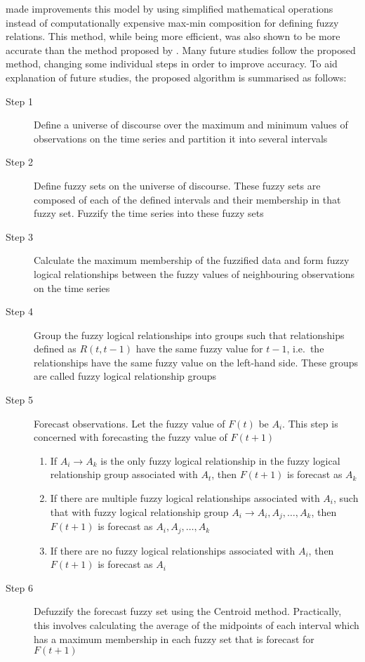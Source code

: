 \documentclass[12pt]{article}
\theoremstyle{definition}
\begin{document}
\cite{chen1996forecasting} made improvements this model by using simplified mathematical operations instead of computationally expensive max-min composition for defining fuzzy relations. This method, while being more efficient, was also shown to be more accurate than the method proposed by \cite{song1993forecasting}. Many future studies follow the proposed method, changing some individual steps in order to improve accuracy. To aid explanation of future studies, the proposed algorithm is summarised as follows:

\begin{description}
\item[Step 1] Define a universe of discourse over the maximum and minimum values of observations on the time series and partition it into several intervals
\item[Step 2] Define fuzzy sets on the universe of discourse. These fuzzy sets are composed of each of the defined intervals and their membership in that fuzzy set. Fuzzify the time series into these fuzzy sets
\item[Step 3] Calculate the maximum membership of the fuzzified data and form fuzzy logical relationships between the fuzzy values of neighbouring observations on the time series
\item[Step 4] Group the fuzzy logical relationships into groups such that relationships defined as $R(t,t-1)$ have the same fuzzy value for $t-1$, i.e.\ the relationships have the same fuzzy value on the left-hand side. These groups are called fuzzy logical relationship groups
\item[Step 5] Forecast observations. Let the fuzzy value of $F(t)$ be $A_i$. This step is concerned with forecasting the fuzzy value of $F(t+1)$
\begin{enumerate}
\item If  $A_i \rightarrow A_k$ is the only fuzzy logical relationship in the fuzzy logical relationship group associated with $A_t$, then $F(t+1)$ is forecast as $A_k$ 
\item If there are multiple fuzzy logical relationships associated with $A_i$, such that with fuzzy logical relationship group $A_i \rightarrow A_{i}, A_{j}, \ldots, A_{k}$, then $F(t+1)$ is forecast as $A_{i}, A_{j}, \ldots, A_{k}$
\item If there are no fuzzy logical relationships associated with $A_i$, then $F(t+1)$ is forecast as $A_i$
\end{enumerate}
\item[Step 6] Defuzzify the forecast fuzzy set using the Centroid method. Practically, this involves calculating the average of the midpoints of each interval which has a maximum membership in each fuzzy set that is forecast for $F(t+1)$
\end{description}
\end{document}
